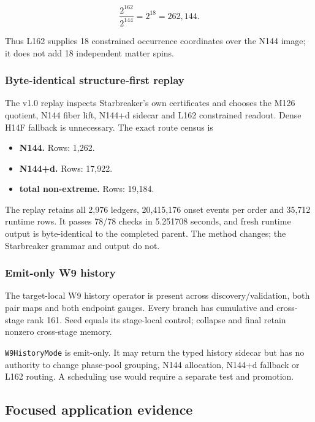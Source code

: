\[
\frac{2^{162}}{2^{144}}=2^{18}=262{,}144.
\]

Thus L162 supplies 18 constrained occurrence coordinates over the N144
image; it does not add 18 independent matter spins.

\subsubsection{Byte-identical structure-first
replay}\label{viii-ch08-byte-identical-structure-first-replay}

The v1.0 replay inspects Starbreaker's own certificates and chooses the
M126 quotient, N144 fiber lift, N144+d sidecar and L162 constrained
readout. Dense H14F fallback is unnecessary. The exact route census is

\begin{itemize}
\tightlist
\item
  \textbf{N144.} Rows: 1,262.
\item
  \textbf{N144+d.} Rows: 17,922.
\item
  \textbf{total non-extreme.} Rows: 19,184.
\end{itemize}

The replay retains all 2,976 ledgers, 20,415,176 onset events per order
and 35,712 runtime rows. It passes 78/78 checks in 5.251708 seconds, and
fresh runtime output is byte-identical to the completed parent. The
method changes; the Starbreaker grammar and output do not.

\subsubsection{Emit-only W9 history}\label{viii-ch08-emit-only-w9-history}

The target-local W9 history operator is present across
discovery/validation, both pair maps and both endpoint gauges. Every
branch has cumulative and cross-stage rank 161. Seed equals its
stage-local control; collapse and final retain nonzero cross-stage
memory.

\texttt{W9HistoryMode} is emit-only. It may return the typed history
sidecar but has no authority to change phase-pool grouping, N144
allocation, N144+d fallback or L162 routing. A scheduling use would
require a separate test and promotion.

\subsection{Focused application
evidence}\label{viii-ch08-focused-application-evidence}

